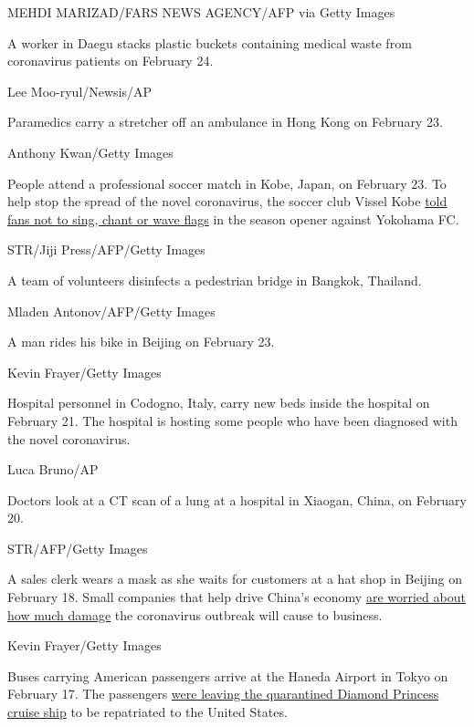 MEHDI MARIZAD/FARS NEWS AGENCY/AFP via Getty Images

A worker in Daegu stacks plastic buckets containing medical waste from
coronavirus patients on February 24.

Lee Moo-ryul/Newsis/AP

Paramedics carry a stretcher off an ambulance in Hong Kong on February
23.

Anthony Kwan/Getty Images

People attend a professional soccer match in Kobe, Japan, on February
23. To help stop the spread of the novel coronavirus, the soccer club
Vissel Kobe
\href{https://www.espn.com/soccer/vissel-kobe/story/4057914/iniestas-vissel-kobe-ban-singing-chanting-due-to-coronavirus-threat}{told
fans not to sing, chant or wave flags} in the season opener against
Yokohama FC.

STR/Jiji Press/AFP/Getty Images

A team of volunteers disinfects a pedestrian bridge in Bangkok,
Thailand.

Mladen Antonov/AFP/Getty Images

A man rides his bike in Beijing on February 23.

Kevin Frayer/Getty Images

Hospital personnel in Codogno, Italy, carry new beds inside the hospital
on February 21. The hospital is hosting some people who have been
diagnosed with the novel coronavirus.

Luca Bruno/AP

Doctors look at a CT scan of a lung at a hospital in Xiaogan, China, on
February 20.

STR/AFP/Getty Images

A sales clerk wears a mask as she waits for customers at a hat shop in
Beijing on February 18.
\href{https://www.cnn.com/2020/02/14/economy/coronavirus-china-economy-small-businesses/index.html}{}
Small companies that help drive China's economy
\href{https://www.cnn.com/2020/02/14/economy/coronavirus-china-economy-small-businesses/index.html}{are
worried about how much damage} the coronavirus outbreak will cause to
business.

Kevin Frayer/Getty Images

Buses carrying American passengers arrive at the Haneda Airport in Tokyo
on February 17. The passengers
\href{https://www.cnn.com/2020/02/17/health/diamond-princess-american-evacuees-flight/index.html}{were
leaving the quarantined Diamond Princess cruise ship} to be repatriated
to the United States.

